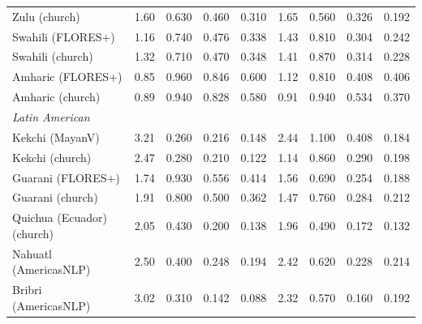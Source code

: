 \begin{table}[htbp]
\begin{tabular}{lrrrrrrrr}
Zulu (church) & 1.60 & \cellcolor{loss!34}0.630 & \cellcolor{loss!25}0.460 & \cellcolor{loss!17}0.310 & 1.65 & \cellcolor{loss!31}0.560 & \cellcolor{loss!18}0.326 & \cellcolor{loss!10}0.192 \\
Swahili (FLORES+) & 1.16 & \cellcolor{loss!40}0.740 & \cellcolor{loss!26}0.476 & \cellcolor{loss!18}0.338 & 1.43 & \cellcolor{loss!44}0.810 & \cellcolor{loss!17}0.304 & \cellcolor{loss!13}0.242 \\
Swahili (church) & 1.32 & \cellcolor{loss!39}0.710 & \cellcolor{loss!26}0.470 & \cellcolor{loss!19}0.348 & 1.41 & \cellcolor{loss!47}0.870 & \cellcolor{loss!17}0.314 & \cellcolor{loss!12}0.228 \\
Amharic (FLORES+) & 0.85 & \cellcolor{loss!52}0.960 & \cellcolor{loss!46}0.846 & \cellcolor{loss!33}0.600 & 1.12 & \cellcolor{loss!44}0.810 & \cellcolor{loss!22}0.408 & \cellcolor{loss!22}0.406 \\
Amharic (church) & 0.89 & \cellcolor{loss!51}0.940 & \cellcolor{loss!45}0.828 & \cellcolor{loss!32}0.580 & 0.91 & \cellcolor{loss!51}0.940 & \cellcolor{loss!29}0.534 & \cellcolor{loss!20}0.370 \\
\midrule \multicolumn{9}{l}{\textit{Latin American}} \\
Kekchi (MayanV) & 3.21 & \cellcolor{loss!14}0.260 & \cellcolor{loss!12}0.216 & \cellcolor{loss!8}0.148 & 2.44 & \cellcolor{loss!60}1.100 & \cellcolor{loss!22}0.408 & \cellcolor{loss!10}0.184 \\
Kekchi (church) & 2.47 & \cellcolor{loss!15}0.280 & \cellcolor{loss!11}0.210 & \cellcolor{loss!7}0.122 & 1.14 & \cellcolor{loss!47}0.860 & \cellcolor{loss!16}0.290 & \cellcolor{loss!11}0.198 \\
Guarani (FLORES+) & 1.74 & \cellcolor{loss!51}0.930 & \cellcolor{loss!30}0.556 & \cellcolor{loss!23}0.414 & 1.56 & \cellcolor{loss!38}0.690 & \cellcolor{loss!14}0.254 & \cellcolor{loss!10}0.188 \\
Guarani (church) & 1.91 & \cellcolor{loss!44}0.800 & \cellcolor{loss!27}0.500 & \cellcolor{loss!20}0.362 & 1.47 & \cellcolor{loss!41}0.760 & \cellcolor{loss!15}0.284 & \cellcolor{loss!12}0.212 \\
Quichua (Ecuador) (church) & 2.05 & \cellcolor{loss!23}0.430 & \cellcolor{loss!11}0.200 & \cellcolor{loss!8}0.138 & 1.96 & \cellcolor{loss!27}0.490 & \cellcolor{loss!9}0.172 & \cellcolor{loss!7}0.132 \\
Nahuatl (AmericasNLP) & 2.50 & \cellcolor{loss!22}0.400 & \cellcolor{loss!14}0.248 & \cellcolor{loss!11}0.194 & 2.42 & \cellcolor{loss!34}0.620 & \cellcolor{loss!12}0.228 & \cellcolor{loss!12}0.214 \\
Bribri (AmericasNLP) & 3.02 & \cellcolor{loss!17}0.310 & \cellcolor{loss!8}0.142 & \cellcolor{loss!5}0.088 & 2.32 & \cellcolor{loss!31}0.570 & \cellcolor{loss!9}0.160 & \cellcolor{loss!10}0.192 \\
\bottomrule
\end{tabular}
\end{table}
